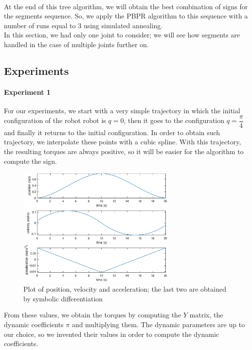 \documentclass{article}
\begin{document}
\paragraph{}At the end of this tree algorithm, we will obtain the best combination of signs for the segments sequence. So, we apply the PBPR algorithm to this sequence with a number of runs equal to 3 using simulated annealing.\\

In this section, we had only one joint to consider; we will see how segments are handled in the case of multiple joints further on.

\subsection{Experiments}
\paragraph{Experiment 1}
For our experiments, we start with a very simple trajectory in which the initial configuration of the robot robot is $q = 0$, then it goes to the configuration $q = \dfrac{\pi}{4}$ and finally it returns to the initial configuration. In order to obtain such trajectory, we interpolate these points with a cubic spline. With this trajectory, the resulting torques are always positive, so it will be easier for the algorithm to compute the sign.

\begin{figure}[!htbp]
\centering
\includegraphics[width=0.7\textwidth]{images/1-dof/trajectory_easy1.eps}
\caption{Plot of position, velocity and acceleration; the last two are obtained by symbolic differentiation}
\end{figure}
\FloatBarrier

From these values, we obtain the torques by computing the $Y$ matrix, the dynamic coefficients $\pi$ and multiplying them. The dynamic parameters are up to our choice, so we invented their values in order to compute the dynamic coefficients. \\
\end{document}
